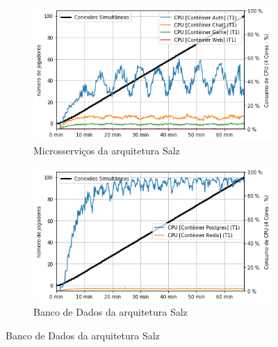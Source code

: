 \begin{figure}[htb!]
    \begin{subfigure}{.5\textwidth}
        \centering
        \includegraphics[width=.95\linewidth]{figuras/testes/s_cpu_game.png}
        \caption{Microsserviços da arquitetura Salz}
        \label{fig:s_cpu_game}
    \end{subfigure}%
    \begin{subfigure}{.5\textwidth}
        \centering
        \includegraphics[width=.95\linewidth]{figuras/testes/s_cpu_db.png}
        \caption{Banco de Dados da arquitetura Salz}
        \label{fig:s_cpu_db}
    \end{subfigure}%
    

\end{figure}
